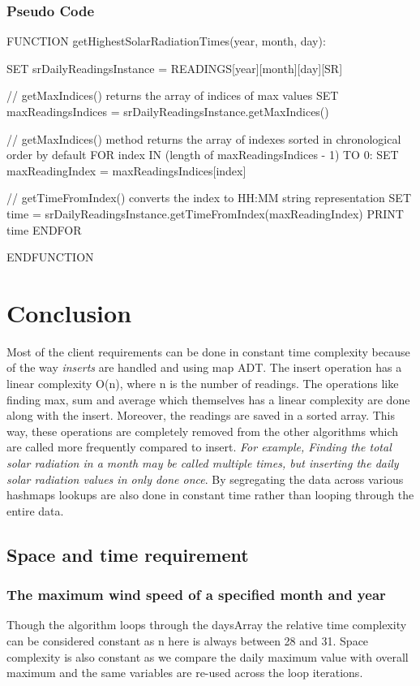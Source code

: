\documentclass[12pt]{article}
\begin{document}
\subsubsection{Pseudo Code}
\begin{algorithm}[caption={Show the times for the highest solar radiation for a given date, including uplicates, displayed in reverse chronological order}, label=algo5]
	FUNCTION getHighestSolarRadiationTimes(year, month, day):
	
	SET srDailyReadingsInstance = READINGS[year][month][day][SR]
	
	// getMaxIndices() returns the array of indices of max values
	SET maxReadingsIndices = srDailyReadingsInstance.getMaxIndices()
	
	// getMaxIndices() method returns the array of indexes sorted in chronological order by default
	FOR index IN (length of maxReadingsIndices - 1) TO 0:
	SET maxReadingIndex = maxReadingsIndices[index]
	
	// getTimeFromIndex() converts the index to HH:MM string representation
	SET time = srDailyReadingsInstance.getTimeFromIndex(maxReadingIndex)
	PRINT time
	ENDFOR
	
	ENDFUNCTION
\end{algorithm}
\section{Conclusion}
Most of the client requirements can be done in constant time complexity because of the way {\em inserts} are handled and using map ADT. The insert operation has a linear complexity O(n), where n is the number of readings. The operations like finding max, sum and average which themselves has a linear complexity are done along with the insert. Moreover, the readings are saved in a sorted array. This way, these operations are completely removed from the other algorithms which are called more frequently compared to insert. {\em For example, Finding the total solar radiation in a month may be called multiple times, but inserting the daily solar radiation values in only done once}. By segregating the data across various hashmaps lookups are also done in constant time rather than looping through the entire data.
\subsection{Space and time requirement}
\subsubsection{The maximum wind speed of a specified month and year}
Though the algorithm loops through the daysArray the relative time complexity can be considered constant as n here is always between 28 and 31. Space complexity is also constant as we compare the daily maximum value with overall maximum and the same variables are re-used across the loop iterations.
\end{document}

